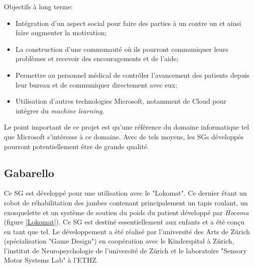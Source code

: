 		Objectifs à long terme:
		\begin{itemize}
			\item Intégration d'un aspect social pour faire des parties à un contre un et ainsi faire augmenter la motivation;
			\item La construction d'une communauté où ils pourront communiquer leurs problèmes et recevoir des encouragements et de l'aide;
			\item Permettre au personnel médical de contrôler l'avancement des patients depuis leur bureau et de communiquer directement avec eux;
			\item Utilisation d'autres technologies Microsoft, notamment de Cloud pour intégrer du \textit{machine learning}.%
		\end{itemize}
		Le point important de ce projet est qu'une référence du domaine informatique tel que Microsoft s'intéresse à ce domaine. Avec de tels moyens, les SGs développés pourront potentiellement être de grande qualité.
				
				
	\subsection*{Gabarello}
		Ce SG est développé pour une utilisation avec le "Lokomat". Ce dernier étant un robot de réhabilitation des jambes contenant principalement un tapis roulant, un exosquelette et un système de soutien du poids du patient développé par \textit{Hocoma} \cite{Lokomat_Brochure} (figure \ref{Lokomat}). Ce SG est destiné essentiellement aux enfants et a été conçu en tant que tel. Le développement a été réalisé par l'université des Arts de Zürich (spécialisation "Game Design") en coopération avec le Kinderspital à Zürich, l'institut de Neuropsychologie de l'université de Zürich et le laboratoire "Sensory Motor Systems Lab" à l'ETHZ.\medskip
		
